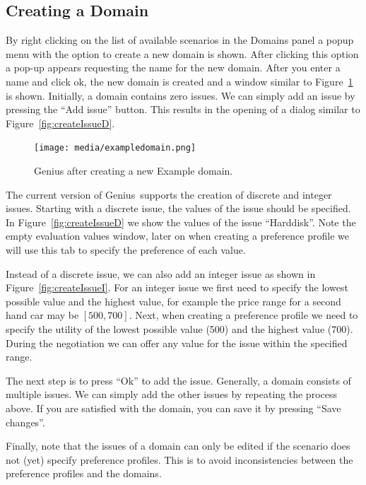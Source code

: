 \documentclass[]{article}
\newcommand\Genius{{\sc Genius}}
\begin{document}
\subsection{Creating a Domain}
By right clicking on the list of available scenarios in the Domains panel a popup menu with the option to create a new domain is shown. After clicking this option a pop-up appears requesting the name for the new domain. After you enter a name and click ok, the new domain is created and a window similar to Figure~\ref{Fig:newdomain} is shown. Initially, a domain contains zero issues. We can simply add an issue by pressing the ``Add issue'' button. This results in the opening of a dialog similar to Figure~\ref{fig:createIssueD}.

\begin{figure}[htb]
	\centering
	\texttt{[image: media/exampledomain.png]}
\caption{{\Genius} after creating a new Example domain.}\label{Fig:newdomain}
\end{figure}

The current version of {\Genius}~supports the creation of discrete and integer issues. Starting with a discrete issue, the values of the issue should be specified. In Figure~\ref{fig:createIssueD} we show the values of the issue ``Harddisk''. Note the empty evaluation values window, later on when creating a preference profile we will use this tab to specify the preference of each value.

Instead of a discrete issue, we can also add an integer issue as shown in Figure~\ref{fig:createIssueI}. For an integer issue we first need to specify the lowest possible value and the highest value, for example the price range for a second hand car may be $[500, 700]$. Next, when creating a preference profile we need to specify the utility of the lowest possible value (500) and the highest value (700). During the negotiation we can offer any value for the issue within the specified range.

The next step is to press ``Ok'' to add the issue. Generally, a domain consists of multiple issues. We can simply add the other issues by repeating the process above. If you are satisfied with the domain, you can save it by pressing  ``Save changes''.

Finally, note that the issues of a domain can only be edited if the scenario does not (yet) specify preference profiles. This is to avoid inconsistencies between the preference profiles and the domains. 
\end{document}
